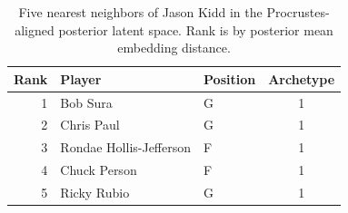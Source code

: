 \begin{table}[htbp]
  \centering\small
  \begin{tabular}{rllc}
    \toprule
    Rank & Player & Position & Archetype \\
    \midrule
    1 & Bob Sura & G & 1 \\
    2 & Chris Paul & G & 1 \\
    3 & Rondae Hollis-Jefferson & F & 1 \\
    4 & Chuck Person & F & 1 \\
    5 & Ricky Rubio & G & 1 \\
    \bottomrule
  \end{tabular}
  \caption{Five nearest neighbors of Jason Kidd in the Procrustes-aligned posterior latent space. Rank is by posterior mean embedding distance.}
  \label{tab:Jason_Kidd_neighbors}
\end{table}

